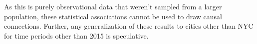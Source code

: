 \documentclass[11pt,notitlepage]{article}
\begin{document}
As this is purely observational data that weren't sampled from a larger population, these statistical associations cannot be used to draw causal connections. Further, any generalization of these results to cities other than NYC for time periods other than 2015 is speculative.



\listoftodos

\pagebreak

%
%
\end{document}
